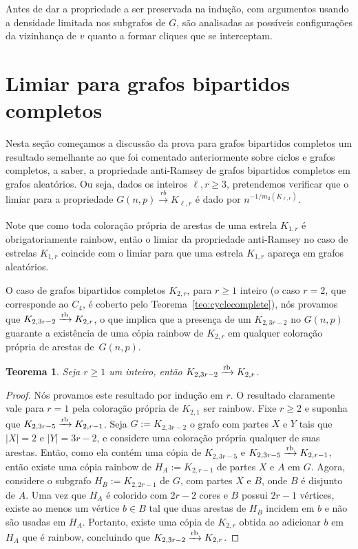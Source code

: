 \documentclass[12pt,a4paper]{book}
\newcommand{\K}{K_{\ell,r}} %
\newcommand{\rb}{\xrightarrow{\text{\rm rb}}}
\newtheorem{teorema}{Teorema}[chapter]
\begin{document}
    Antes de dar a propriedade a ser preservada na indução, com argumentos usando a densidade limitada nos subgrafos de $G$, são analisadas as possíveis configurações da vizinhança de $v$ quanto a formar cliques que se interceptam. 
 
 
\section{Limiar para grafos bipartidos completos}

    Nesta seção começamos a discussão da prova para grafos bipartidos completos um resultado semelhante ao que foi comentado anteriormente sobre ciclos e grafos completos, a saber, a propriedade anti-Ramsey de grafos bipartidos completos em grafos aleatórios.
    Ou seja, dados os inteiros $\ell,r \geq 3$, pretendemos verificar que o limiar para a propriedade $G(n,p) \xrightarrow[]{rb} \K$ é dado por $n^{-1/m_2(\K)}$.

    Note que como toda coloração própria de arestas de uma estrela $K_{1,r}$ é obrigatoriamente rainbow, então
    o limiar da propriedade anti-Ramsey no caso de estrelas $K_{1,r}$ coincide com o limiar para que uma estrela $K_{1,r}$ apareça em grafos aleatórios.

    O caso de grafos bipartidos completos $K_{2,r}$, para $r\geq 1$ inteiro (o caso $r=2$, que corresponde ao $C_4$, é coberto pelo
    Teorema~\ref{teo:cyclecomplete}),
    nós provamos que $K_{2,3r-2} \rb K_{2,r}$, 
    o que implica que  a presença de um $K_{2,3r-2}$ no
    $G(n,p)$ guarante a existência de uma cópia rainbow de $K_{2,r}$ em qualquer coloração própria de arestas de~$G(n,p)$.  

     \begin{teorema}\label{teo:below} Seja $r\geq 1$ um inteiro, então
    $K_{2,3r-2} \rb K_{2,r}$.
     \end{teorema}
     \begin{proof} Nós provamos este resultado por indução em $r$. 
     O resultado claramente vale para $r=1$ pela coloração própria de $K_{2,1}$ ser rainbow. 
     Fixe $r\geq 2$ e suponha que $K_{2,3r-5} \rb K_{2,r-1}$. 
     Seja $G:=K_{2,3r-2}$ o grafo com partes $X$ e $Y$ tais que $|X|=2$ e $|Y|=3r-2$, e considere uma coloração própria qualquer de suas arestas.
     Então, como ela contém uma cópia de $K_{2,3r-5}$ e $K_{2,3r-5} \rb K_{2,r-1}$, então existe uma 
     cópia rainbow de $H_A:=K_{2,r-1}$ de partes $X$ e $A$ em $G$.
     Agora, considere  o subgrafo $H_B:=K_{2,2r-1}$ de $G$, com partes $X$ e $B$, onde $B$ é disjunto de $A$. 
     Uma vez que $H_A$ é colorido com $2r-2$ cores e $B$ possui
    $2r-1$ vértices, existe ao menos um vértice $b\in B$ tal que
    duas arestas de $H_B$ incidem em $b$ e não são usadas em $H_A$. 
    Portanto, existe uma cópia de $K_{2,r}$ obtida ao adicionar $b$ em $H_A$ que é rainbow, concluindo que  $K_{2,3r-2} \rb K_{2,r}$.
     \end{proof}
    
\end{document}

